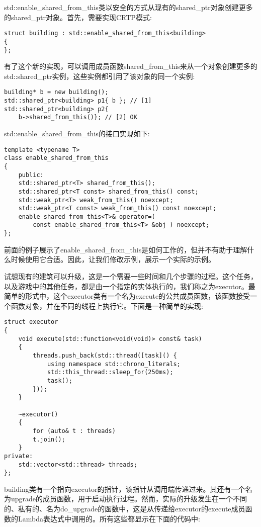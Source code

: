 std::enable\_shared\_from\_this类以安全的方式从现有的shared\_ptr对象创建更多的shared\_ptr对象。首先，需要实现CRTP模式:

\begin{lstlisting}[style=styleCXX]
struct building : std::enable_shared_from_this<building>
{
};
\end{lstlisting}

有了这个新的实现，可以调用成员函数shared\_from\_this来从一个对象创建更多的std::shared\_ptr实例，这些实例都引用了该对象的同一个实例:

\begin{lstlisting}[style=styleCXX]
building* b = new building();
std::shared_ptr<building> p1{ b }; // [1]
std::shared_ptr<building> p2{
	b->shared_from_this()}; // [2] OK
\end{lstlisting}

std::enable\_shared\_from\_this的接口实现如下:

\begin{lstlisting}[style=styleCXX]
template <typename T>
class enable_shared_from_this
{
	public:
	std::shared_ptr<T> shared_from_this();
	std::shared_ptr<T const> shared_from_this() const;
	std::weak_ptr<T> weak_from_this() noexcept;
	std::weak_ptr<T const> weak_from_this() const noexcept;
	enable_shared_from_this<T>& operator=(
		const enable_shared_from_this<T> &obj ) noexcept;
};
\end{lstlisting}

前面的例子展示了enable\_shared\_from\_this是如何工作的，但并不有助于理解什么时候使用它合适。因此，让我们修改示例，展示一个实际的示例。

试想现有的建筑可以升级，这是一个需要一些时间和几个步骤的过程。这个任务，以及游戏中的其他任务，都是由一个指定的实体执行的，我们称之为executor。最简单的形式中，这个executor类有一个名为execute的公共成员函数，该函数接受一个函数对象，并在不同的线程上执行它。下面是一种简单的实现:

\begin{lstlisting}[style=styleCXX]
struct executor
{
	void execute(std::function<void(void)> const& task)
	{
		threads.push_back(std::thread([task]() {
			using namespace std::chrono_literals;
			std::this_thread::sleep_for(250ms);
			task();
		}));
	}

	~executor()
	{
		for (auto& t : threads)
		t.join();
	}
private:
	std::vector<std::thread> threads;
};
\end{lstlisting}

building类有一个指向executor的指针，该指针从调用端传递过来。其还有一个名为upgrade的成员函数，用于启动执行过程。然而，实际的升级发生在一个不同的、私有的、名为do\_upgrade的函数中，这是从传递给executor的execute成员函数的Lambda表达式中调用的。所有这些都显示在下面的代码中:

